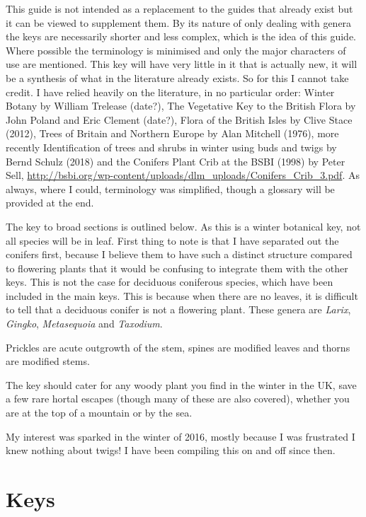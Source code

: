 \documentclass[openany]{book}
\begin{document}
This guide is not intended as a replacement to the guides that already
exist but it can be viewed to supplement them. By its nature of only
dealing with genera the keys are necessarily shorter and less complex,
which is the idea of this guide. Where possible the terminology is
minimised and only the major characters of use are mentioned. This key
will have very little in it that is actually new, it will be a synthesis
of what in the literature already exists. So for this I cannot take
credit. I have relied heavily on the literature, in no particular order:
Winter Botany by William Trelease (date?), The Vegetative Key to the
British Flora by John Poland and Eric Clement (date?), Flora of the
British Isles by Clive Stace (2012), Trees of Britain and Northern
Europe by Alan Mitchell (1976), more recently Identification of trees
and shrubs in winter using buds and twigs by Bernd Schulz (2018) and the
Conifers Plant Crib at the BSBI (1998) by Peter Sell,
\url{http://bsbi.org/wp-content/uploads/dlm_uploads/Conifers_Crib_3.pdf}.
As always, where I could, terminology was simplified, though a glossary
will be provided at the end.

The key to broad sections is outlined below. As this is a winter
botanical key, not all species will be in leaf. First thing to note is
that I have separated out the conifers first, because I believe them to
have such a distinct structure compared to flowering plants that it
would be confusing to integrate them with the other keys. This is not
the case for deciduous coniferous species, which have been included in
the main keys. This is because when there are no leaves, it is difficult
to tell that a deciduous conifer is not a flowering plant. These genera
are \emph{Larix}, \emph{Gingko}, \emph{Metasequoia} and \emph{Taxodium}.

Prickles are acute outgrowth of the stem, spines are modified leaves and
thorns are modified stems.

The key should cater for any woody plant you find in the winter in the
UK, save a few rare hortal escapes (though many of these are also
covered), whether you are at the top of a mountain or by the sea.

My interest was sparked in the winter of 2016, mostly because I was
frustrated I knew nothing about twigs! I have been compiling this on and
off since then.

\hypertarget{keys}{%
\chapter{Keys}\label{keys}}
\end{document}
